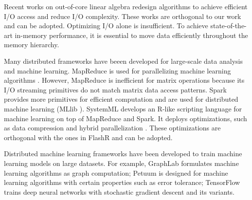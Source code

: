 
Recent works on out-of-core linear algebra \cite{Toledo99, Quintana-Orti12}
redesign algorithms to achieve efficient I/O access and reduce I/O
complexity. These works are orthogonal to our work and can be adopted.
Optimizing I/O alone is insufficient. To achieve state-of-the-art in-memory
performance, it is essential to move data efficiently throughout
the memory hierarchy.

Many distributed frameworks have beeen developed for large-scale data analysis
and machine learning. MapReduce \cite{mapreduce} is used for parallelizing
machine learning algorithms \cite{Chu06}.
However, MapReduce is inefficient
for matrix operations because its I/O streaming primitives do not match matrix
data access patterns. Spark \cite{spark} provides more primitives for efficient
computation and are used for distributed machine learning (MLlib \cite{mllib}).
SystemML \cite{systemml, systemml2} develops an R-like scripting language for
machine learning on top of MapReduce and Spark. It deploys optimizations,
such as data compression \cite{Elgohary16} and hybrid parallelization
\cite{Boehm14}. These optimizations are orthogonal with the ones in FlashR
and can be adopted.

Distributed machine learning frameworks have been developed to train machine
learning models on large datasets. For example, GraphLab \cite{graphlab}
formulates machine learning algorithms as graph computation; Petuum \cite{petuum}
is designed for machine learning algorithms with certain properties such as
error tolerance; TensorFlow \cite{tensorflow} trains deep neural networks
with stochastic gradient descent and its variants.

